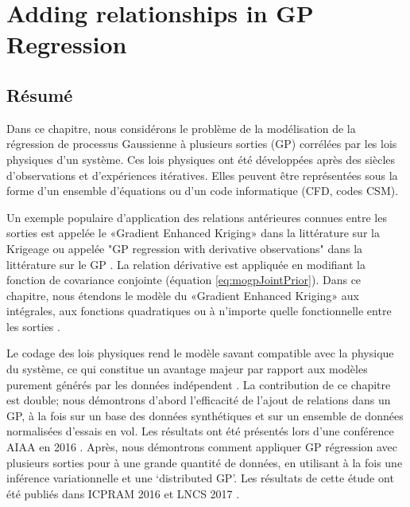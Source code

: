 \chapter{Adding relationships in GP Regression}
\label{chapAddingEquationsInGP}

\begin{mdframed}[hidealllines=true,backgroundcolor=lightgray!20]
\section*{Résumé}
Dans ce chapitre, nous considérons le problème de la modélisation de la régression de processus Gaussienne à plusieurs sorties (GP) corrélées par les lois physiques d'un système. Ces lois physiques ont été développées après des siècles d'observations et d'expériences itératives. Elles peuvent être représentées sous la forme d'un ensemble d'équations ou d'un code informatique (CFD, codes CSM).

Un exemple populaire d'application des relations antérieures connues entre les sorties est appelée le «Gradient Enhanced Kriging» dans la littérature sur la Krigeage  \cite{chung2002using, morris1993bayesian, forrester2009recent} ou appelée "GP regression with derivative observations" dans la littérature sur le GP \cite{NIPSDerivativeGP}. La relation dérivative est appliquée en modifiant la fonction de covariance conjointe (équation \ref{eq:mogpJointPrior}). Dans ce chapitre, nous étendons le modèle du «Gradient Enhanced Kriging» aux intégrales, aux fonctions quadratiques ou à n’importe quelle fonctionnelle entre les sorties \cite{ Constantinescu2013}.

Le codage des lois physiques rend le modèle savant compatible avec la physique du système, ce qui constitue un avantage majeur par rapport aux modèles purement générés par les données indépendent \cite{jazwinski2007stochastic}. La contribution de ce chapitre est double; nous démontrons d'abord l'efficacité de l'ajout de relations dans un GP, à la fois sur un base des données  synthétiques et sur un ensemble de données normalisées d'essais en vol. Les résultats ont été présentés lors d'une conférence AIAA en 2016 \cite{oatao18001}. Après, nous démontrons comment appliquer GP régression avec plusieurs sorties pour à une grande quantité de données, en utilisant à la fois une inférence variationnelle et une `distributed GP’. Les résultats de cette étude ont été publiés dans ICPRAM 2016 et LNCS 2017 \cite{icpram16Ankit, oatao18000}.
\end{mdframed}


